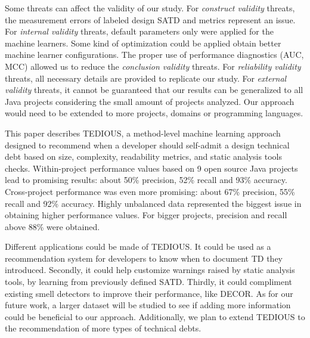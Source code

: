 Some threats can affect the validity of our study. For \emph{construct validity} threats, the measurement errors of labeled design \ac{SATD} and metrics represent an issue. For \emph{internal validity} threats, default parameters only were applied for the machine learners. Some kind of optimization could be applied obtain better machine learner configurations. The proper use of performance diagnostics (\ac{AUC}, \ac{MCC}) allowed us to reduce the \emph{conclusion validity} threats. For \emph{reliability validity} threats, all necessary details are provided to replicate our study. For \emph{external validity} threats, it cannot be guaranteed that our results can be generalized to all Java projects considering the small amount of projects analyzed. Our approach would need to be extended to more projects, domains or programming languages. \par

This paper describes \ac{TEDIOUS}, a method-level machine learning approach designed to recommend when a developer should self-admit a design technical debt based on size, complexity, readability metrics, and static analysis tools checks. Within-project performance values based on 9 open source Java projects lead to promising results: about 50\% precision, 52\% recall and 93\% accuracy. Cross-project performance was even more promising: about 67\% precision, 55\% recall and 92\% accuracy. Highly unbalanced data represented the biggest issue in obtaining higher performance values. For bigger projects, precision and recall above 88\% were obtained. \par

Different applications could be made of \ac{TEDIOUS}. It could be used as a recommendation system for developers to know when to document \ac{TD} they introduced. Secondly, it could help customize warnings raised by static analysis tools, by learning from previously defined \ac{SATD}. Thirdly, it could compliment existing smell detectors to improve their performance, like \ac{DECOR}. As for our future work, a larger dataset will be studied to see if adding more information could be beneficial to our approach. Additionally, we plan to extend \ac{TEDIOUS} to the recommendation of more types of technical debts.





















